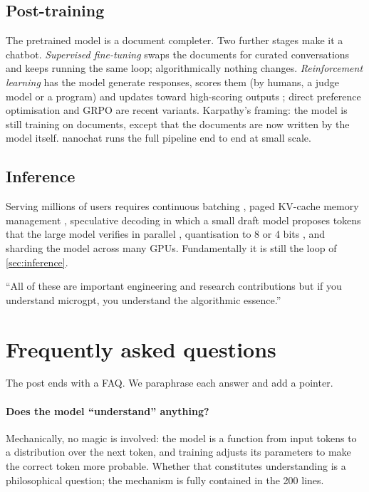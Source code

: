 \documentclass[11pt,letterpaper]{article}
\theoremstyle{remark}
\begin{document}
\subsection{Post-training}
The pretrained model is a document completer. Two further stages make it a chatbot. \emph{Supervised fine-tuning} swaps the documents for curated conversations and keeps running the same loop; algorithmically nothing changes. \emph{Reinforcement learning} has the model generate responses, scores them (by humans, a judge model or a program) and updates toward high-scoring outputs \parencite{christiano2017rlhf,ouyang2022instructgpt,schulman2017ppo}; direct preference optimisation \parencite{rafailov2023dpo} and GRPO \parencite{shao2024grpo} are recent variants. Karpathy's framing: the model is still training on documents, except that the documents are now written by the model itself. nanochat \parencite{karpathy2025nanochat} runs the full pipeline end to end at small scale.

\subsection{Inference}
Serving millions of users requires continuous batching \parencite{yu2022orca}, paged KV-cache memory management \parencite{kwon2023vllm}, speculative decoding in which a small draft model proposes tokens that the large model verifies in parallel \parencite{leviathan2023speculative,chen2023speculative}, quantisation to 8 or 4 bits \parencite{dettmers2022int8,frantar2023gptq}, and sharding the model across many GPUs. Fundamentally it is still the loop of \cref{sec:inference}.

\begin{keyidea}
``All of these are important engineering and research contributions but if you understand microgpt, you understand the algorithmic essence.'' \parencite{karpathy2026microgpt}
\end{keyidea}

\section{Frequently asked questions}

The post ends with a FAQ. We paraphrase each answer and add a pointer.

\paragraph{Does the model ``understand'' anything?} Mechanically, no magic is involved: the model is a function from input tokens to a distribution over the next token, and training adjusts its parameters to make the correct token more probable. Whether that constitutes understanding is a philosophical question; the mechanism is fully contained in the 200 lines.
\end{document}
